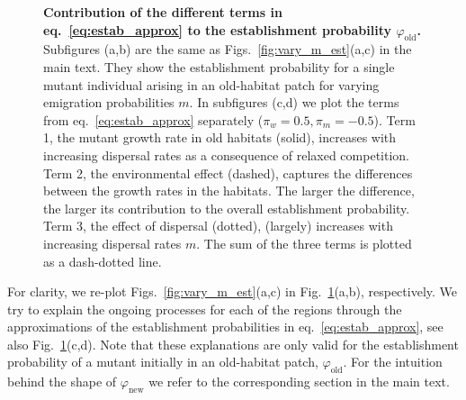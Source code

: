 \documentclass[11pt]{article}
\begin{document}
\begin{figure}[t!]
	\caption{\textbf{Contribution of the different terms in eq.~\eqref{eq:estab_approx} to the establishment probability $\varphi_{\text{old}}$.} Subfigures (a,b) are the same as Figs.~\ref{fig:vary_m_est}(a,c) in the main text. They show the establishment probability for a single mutant individual arising in an old-habitat patch for varying emigration probabilities $m$. In subfigures (c,d) we plot the terms from eq.~\eqref{eq:estab_approx} separately ($\pi_w=0.5,\pi_m=-0.5$). Term 1, the mutant growth rate in old habitats (solid), increases with increasing dispersal rates as a consequence of relaxed competition. Term 2, the environmental effect (dashed), captures the differences between the growth rates in the habitats. The larger the difference, the larger its contribution to the overall establishment probability. Term 3, the effect of dispersal (dotted), (largely) increases with increasing dispersal rates $m$. The sum of the three terms is plotted as a dash-dotted line.}
	\label{Sfig:contribution}
\end{figure}

For clarity, we re-plot Figs.~\ref{fig:vary_m_est}(a,c) in Fig.~\ref{Sfig:contribution}(a,b), respectively. We try to explain the ongoing processes for each of the regions through the approximations of the establishment probabilities in eq.~\eqref{eq:estab_approx}, see also Fig.~\ref{Sfig:contribution}(c,d). Note that these explanations are only valid for the establishment probability of a mutant initially in an old-habitat patch, $\varphi_{\text{old}}$. For the intuition behind the shape of $\varphi_{\text{new}}$ we refer to the corresponding section in the main text.
\end{document}
